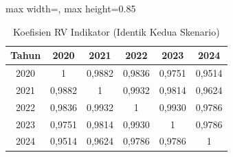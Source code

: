 \begin{table}[H]
\centering
\caption{Koefisien RV Indikator (Identik Kedua Skenario)} \label{tab:apprv_s}
\begin{adjustbox}{max width=\textwidth, max height=0.85\textheight}
\begin{tabular}{|c|c|c|c|c|c|}
\hline
\textbf{Tahun} & \textbf{2020} & \textbf{2021} & \textbf{2022} & \textbf{2023} & \textbf{2024} \\
\hline
2020 & 1 & 0,9882 & 0,9836 & 0,9751 & 0,9514 \\
2021 & 0,9882 & 1 & 0,9932 & 0,9814 & 0,9624 \\
2022 & 0,9836 & 0,9932 & 1 & 0,9930 & 0,9786 \\
2023 & 0,9751 & 0,9814 & 0,9930 & 1 & 0,9786 \\
2024 & 0,9514 & 0,9624 & 0,9786 & 0,9786 & 1 \\
\hline
\end{tabular}
\end{adjustbox}
\end{table}
